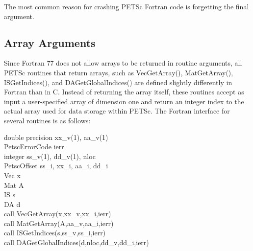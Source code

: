 The most common reason for crashing PETSc Fortran code is forgetting the 
final  argument.

\subsection{Array Arguments}
\label{sec_fortranarrays}

Since Fortran 77 does not allow arrays to be returned in routine
arguments, all PETSc routines that return arrays, such as 
VecGetArray(), MatGetArray(), 
ISGetIndices(), and DAGetGlobalIndices()
are defined slightly differently in Fortran than in C.  
  
 
Instead of returning the array itself, these routines
accept as input a user-specified array of dimension one and return an
integer index to the actual array used for data storage within PETSc.
The Fortran interface for several routines is as follows:
\begin{tabbing}
   double precision xx\_v(1), aa\_v(1)\\
   PetscErrorCode ierr\\
   integer          ss\_v(1), dd\_v(1), nloc\\
   PetscOffset      ss\_i, xx\_i, aa\_i, dd\_i\\
   Vec x\\
   Mat A\\
   IS  s\\
   DA  d \\
 
   call VecGetArray(x,xx\_v,xx\_i,ierr)\\
   call MatGetArray(A,aa\_v,aa\_i,ierr)\\
   call ISGetIndices(s,ss\_v,ss\_i,ierr)\\
   call DAGetGlobalIndices(d,nloc,dd\_v,dd\_i,ierr)
\end{tabbing}

